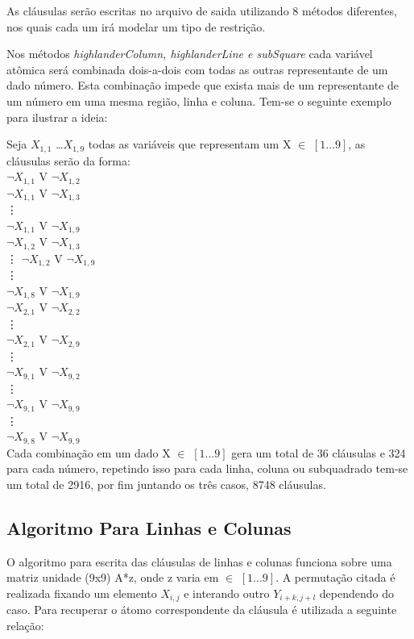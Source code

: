 \documentclass[a4paper]{article}
\begin{document}
As cláusulas serão escritas no arquivo de saida utilizando 8 métodos diferentes, nos quais cada um irá modelar um tipo de restrição.

Nos métodos \textit {highlanderColumn, highlanderLine e subSquare} cada variável atômica será combinada dois-a-dois com todas as outras representante de um dado número. Esta combinação impede que exista mais de um representante de um número em uma mesma região, linha e coluna. Tem-se o seguinte exemplo para ilustrar a ideia:


Seja $X_{1,1}$ \dots $X_{1,9}$ todas as variáveis que representam um X $\in$ $[1 \dots 9]$, as cláusulas serão da forma:\\
$\neg X_{1,1}$  V  $\neg X_{1,2}$\\
$\neg X_{1,1}$  V  $\neg X_{1,3}$\\
\vdots \\
$\neg X_{1,1}$  V  $\neg X_{1,9}$\\
$\neg X_{1,2}$  V  $\neg X_{1,3}$\\
\vdots
$\neg X_{1,2}$  V  $\neg X_{1,9}$\\
\vdots\\
$\neg X_{1,8}$  V  $\neg X_{1,9}$\\
$\neg X_{2,1}$  V  $\neg X_{2,2}$\\
\vdots\\
$\neg X_{2,1}$  V  $\neg X_{2,9}$\\
\vdots\\
$\neg X_{9,1}$  V  $\neg X_{9,2}$\\
\vdots\\
$\neg X_{9,1}$  V  $\neg X_{9,9}$\\
\vdots\\
$\neg X_{9,8}$  V  $\neg X_{9,9}$\\

Cada combinação em um dado X $\in$ $[1 \dots 9]$ gera um total de 36 cláusulas e 324 para cada número, repetindo isso para cada linha, coluna ou subquadrado tem-se um total de 2916, por fim juntando os três casos, 8748 cláusulas.

\subsection{Algoritmo Para Linhas e Colunas}
O algoritmo para escrita das cláusulas de linhas e colunas funciona sobre uma matriz unidade (9x9) A*z, onde z varia em $\in$ $[1 \dots 9]$. A permutação citada é realizada fixando um elemento $X_{i,j}$ e interando outro $Y_{i+k,j+l}$ dependendo do caso. Para recuperar o átomo correspondente da cláusula é utilizada a seguinte relação:
\end{document}
